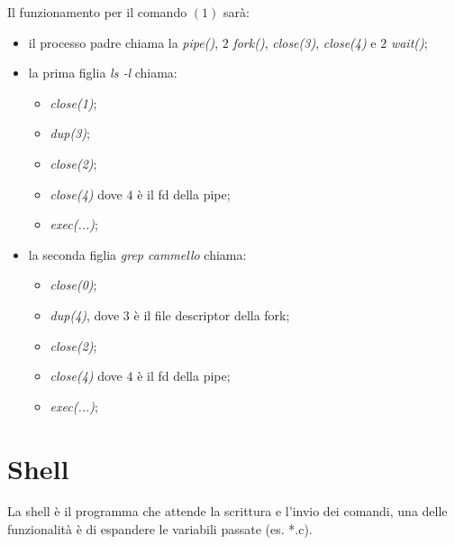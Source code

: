 Il funzionamento per il  comando $(1)$ sarà:
\begin{itemize}
  \item il processo padre chiama la \textit{pipe()}, $2$ \textit{fork()},
    \textit{close(3)}, \textit{close(4)} e $2$ \textit{wait()};
  \item la prima figlia \textit{ls -l} chiama:
    \begin{itemize}
      \item \textit{close(1)};
      \item \textit{dup(3)};
      \item \textit{close(2)};
      \item \textit{close(4)} dove $4$ è il fd della pipe;
      \item \textit{exec(...)};
    \end{itemize}
  \item la seconda figlia \textit{grep cammello} chiama:
    \begin{itemize}
      \item \textit{close(0)};
      \item \textit{dup(4)}, dove $3$ è il file descriptor della fork;
      \item \textit{close(2)};
      \item \textit{close(4)} dove $4$ è il fd della pipe;
      \item \textit{exec(...)};
    \end{itemize}
\end{itemize}

\section{Shell}
La shell è il programma che attende la scrittura e l'invio dei comandi, una
delle funzionalità è di espandere le variabili passate (es. *.c).
